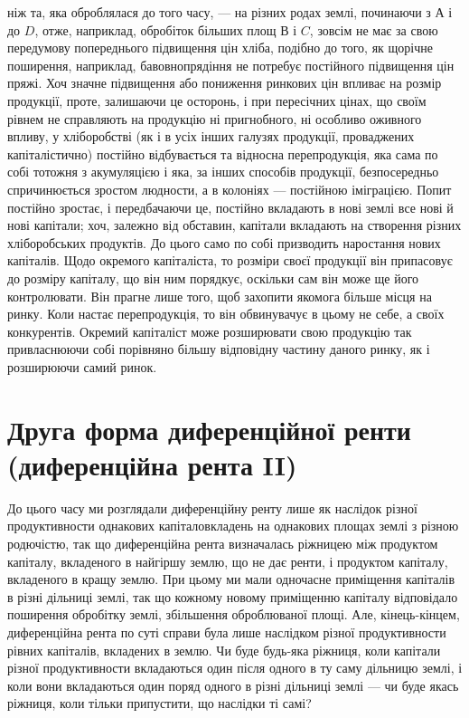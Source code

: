 \parcont{}  %
ніж та, яка оброблялася до того часу, — на різних родах землі, починаючи з $А$
і до $D$, отже, наприклад, обробіток більших площ $В$ і $C$, зовсім не має за свою передумову
попереднього підвищення цін хліба, подібно до того, як щорічне поширення,
наприклад, бавовнопрядіння не потребує постійного підвищення цін пряжі. Хоч
значне підвищення або пониження ринкових цін впливає на розмір продукції,
проте, залишаючи це осторонь, і при пересічних цінах, що своїм рівнем не справляють
на продукцію ні пригнобного, ні особливо оживного впливу, у хліборобстві
(як і в усіх інших галузях продукції, проваджених капіталістично) постійно
відбувається та відносна перепродукція, яка сама по собі тотожня з
акумуляцією і яка, за інших способів продукції, безпосередньо спричинюється
зростом людности, а в колоніях — постійною іміграцією. Попит постійно зростає,
і передбачаючи це, постійно вкладають в нові землі все нові й нові капітали;
хоч, залежно від обставин, капітали вкладають на створення різних хліборобських
продуктів. До цього само по собі призводить наростання нових капіталів.
Щодо окремого капіталіста, то розміри своєї продукції він припасовує до розміру
капіталу, що він ним порядкує, оскільки сам він може ще його контролювати.
Він прагне лише того, щоб захопити якомога більше місця на ринку.
Коли настає перепродукція, то він обвинувачує в цьому не себе, а своїх конкурентів.
Окремий капіталіст може розширювати свою продукцію так привласнюючи
собі порівняно більшу відповідну частину даного ринку, як і розширюючи самий
ринок.

\section{Друга форма диференційної ренти (диференційна рента II)}

До цього часу ми розглядали диференційну ренту лише як наслідок різної
продуктивности однакових капіталовкладень на однакових площах землі з різною
родючістю, так що диференційна рента визначалась ріжницею між продуктом
капіталу, вкладеного в найгіршу землю, що не дає ренти, і продуктом капіталу,
вкладеного в кращу землю. При цьому ми мали одночасне приміщення капіталів
в різні дільниці землі, так що кожному новому приміщенню капіталу відповідало
поширення обробітку землі, збільшення оброблюваної площі. Але, кінець-кінцем,
диференційна рента по суті справи була лише наслідком різної
продуктивности рівних капіталів, вкладених в землю. Чи буде будь-яка ріжниця,
коли капітали різної продуктивности вкладаються один після одного в ту
саму дільницю землі, і коли вони вкладаються один поряд одного в різні дільниці
землі — чи буде якась ріжниця, коли тільки припустити, що наслідки ті самі?

